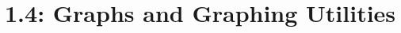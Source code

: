 \documentclass[../mathNotesPreamble]{subfiles}
\begin{document}
  \section{1.4: Graphs and Graphing Utilities}
  \pagebreak
\end{document}
